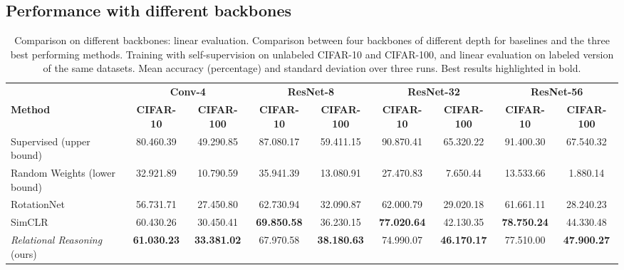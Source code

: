 \documentclass{article}
\begin{document}
\subsection{Performance with different backbones}\label{appendix:additional_backbones}

\begin{table}[H]
 \caption{Comparison on different backbones: linear evaluation. Comparison between four backbones of different depth for baselines and the three best performing methods. Training with self-supervision on unlabeled CIFAR-10 and CIFAR-100, and linear evaluation on labeled version of the same datasets. Mean accuracy (percentage) and standard deviation over three runs. Best results highlighted in bold.}
 \label{tab:backbones_linear}
 \begin{adjustbox}{width=1.0\columnwidth,center}
  \centering
  \begin{tabular}{lcccccccc}
    \toprule
     & \multicolumn{2}{c}{\textbf{Conv-4}} & \multicolumn{2}{c}{\textbf{ResNet-8}} & \multicolumn{2}{c}{\textbf{ResNet-32}} & \multicolumn{2}{c}{\textbf{ResNet-56}}\\
    \cmidrule[0.1pt](r){2-3} \cmidrule[0.1pt](l){4-5} \cmidrule[0.1pt](l){6-7} \cmidrule[0.1pt](l){8-9}
    \textbf{Method} &
    \textbf{CIFAR-10} & \textbf{CIFAR-100} &
    \textbf{CIFAR-10} & \textbf{CIFAR-100} &
    \textbf{CIFAR-10} & \textbf{CIFAR-100} &
    \textbf{CIFAR-10} & \textbf{CIFAR-100} \\
    \midrule
    Supervised (upper bound) & 
    80.46\small{0.39} & 49.29\small{0.85} &
    87.08\small{0.17} & 59.41\small{1.15} &
    90.87\small{0.41} & 65.32\small{0.22} &
    91.40\small{0.30} & 67.54\small{0.32} \\
    Random Weights (lower bound) & 
    32.92\small{1.89} & 10.79\small{0.59} &
    35.94\small{1.39} & 13.08\small{0.91} &
    27.47\small{0.83} &  7.65\small{0.44} &
    13.53\small{3.66} &  1.88\small{0.14} \\
    \cmidrule(l){1-9}
    RotationNet \citep{gidaris2018unsupervised} & 
    56.73\small{1.71} & 27.45\small{0.80} &
    62.73\small{0.94} & 32.09\small{0.87} &
    62.00\small{0.79} & 29.02\small{0.18} &
    61.66\small{1.11} & 28.24\small{0.23} \\
    SimCLR \citep{chen2020simple} & 
    60.43\small{0.26} & 30.45\small{0.41} &
    \textbf{69.85\small{0.58}} & 36.23\small{0.15} &
    \textbf{77.02\small{0.64}} & 42.13\small{0.35} &
    \textbf{78.75\small{0.24}} & 44.33\small{0.48} \\    
    \emph{Relational Reasoning} (ours) & 
    \textbf{61.03\small{0.23}} & \textbf{33.38\small{1.02}} &
    67.97\small{0.58} & \textbf{38.18\small{0.63}} &
    74.99\small{0.07} & \textbf{46.17\small{0.17}} &
    77.51\small{0.00} & \textbf{47.90\small{0.27}} \\
    \bottomrule
  \end{tabular}
 \end{adjustbox}
\end{table}
\end{document}
